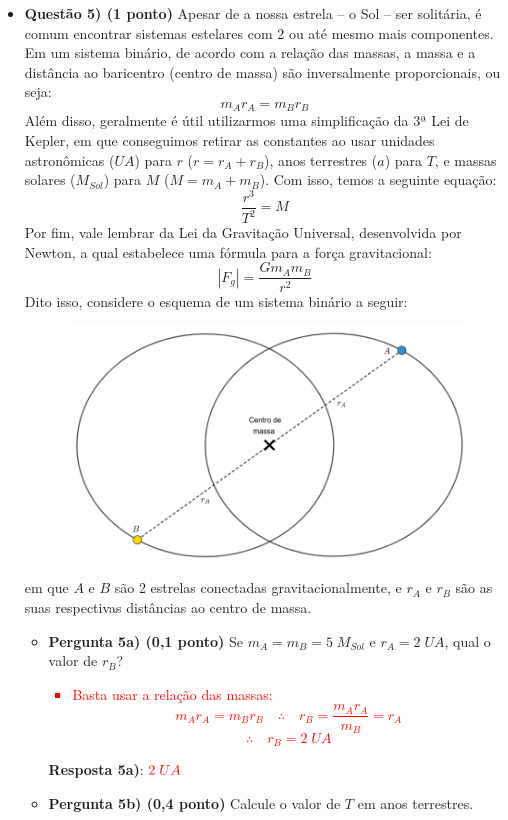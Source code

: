 \documentclass[a4paper, 12pt]{article}
\newcommand{\red}[1]
{
	\textcolor{red}{#1}
}
\begin{document}
\begin{flushleft}
\begin{itemize}
		\item \textbf{Questão 5) (1 ponto)} Apesar de a nossa estrela -- o Sol -- ser solitária, é comum encontrar sistemas estelares com 2 ou até mesmo mais componentes. Em um sistema binário, de acordo com a relação das massas, a massa e a distância ao baricentro (centro de massa) são inversalmente proporcionais, ou seja:
			$$m_Ar_A=m_Br_B$$
		Além disso, geralmente é útil utilizarmos uma simplificação da 3ª Lei de Kepler, em que conseguimos retirar as constantes ao usar unidades astronômicas ($UA$) para $r$ ($r=r_A+r_B$), anos terrestres ($a$) para $T$, e massas solares ($M_{Sol}$) para $M$ ($M=m_A+m_B$). Com isso, temos a seguinte equação:
			$$\frac{r^3}{T^2}=M$$
		Por fim, vale lembrar da Lei da Gravitação Universal, desenvolvida por Newton, a qual estabelece uma fórmula para a força gravitacional:
			$$| F_g | = \frac{Gm_Am_B}{r^2}$$
		Dito isso, considere o esquema de um sistema binário a seguir:
			\begin{figure}[H]
				\centering
				\includegraphics[scale=0.4]{./img/5.png}
			\end{figure}
			em que $A$ e $B$ são 2 estrelas conectadas gravitacionalmente, e $r_A$ e $r_B$ são as suas respectivas distâncias ao centro de massa.
			\begin{itemize}
				\item \textbf{Pergunta 5a) (0,1 ponto)} Se $m_A=m_B= 5 \; M_{Sol}$ e $r_A=2 \; UA$, qual o valor de $r_B$?
					\red{\begin{itemize}
						\item Basta usar a relação das massas:
							$$m_Ar_A=m_Br_B \quad \therefore \quad r_B = \frac{m_Ar_A}{m_B} = r_A$$
							$$\therefore \quad r_B=2 \; UA$$
					\end{itemize}}
					\textbf{Resposta 5a)}: $\red{2 \; UA}$
				\item \textbf{Pergunta 5b) (0,4 ponto)} Calcule o valor de $T$ em anos terrestres.

\end{itemize}
\end{itemize}
\end{flushleft}
\end{document}
